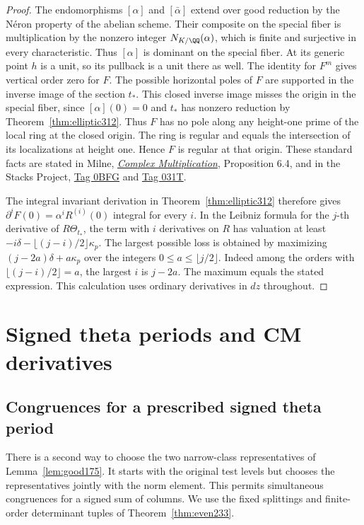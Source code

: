 \documentclass[a4paper,11pt]{article}
\theoremstyle{definition}
\theoremstyle{remark}
\numberwithin{equation}{section}
\begin{document}
\begin{proof}
The endomorphisms \([\alpha]\) and \([\bar\alpha]\) extend over
good reduction by the N\'eron property of the abelian scheme.
Their composite on the special fiber is multiplication by the
nonzero integer \(N_{K/\QQ}(\alpha)\), which is finite and
surjective in every characteristic. Thus \([\alpha]\) is dominant
on the special fiber. At its generic point \(h\) is a unit, so
its pullback is a unit there as well. The identity for \(F^m\)
gives vertical order zero for \(F\). The possible horizontal poles
of \(F\) are supported in the inverse image of the section \(t_*\).
This closed inverse image misses the origin in the special fiber,
since \([\alpha](0)=0\) and \(t_*\) has nonzero reduction by
Theorem~\ref{thm:elliptic312}. Thus \(F\) has no pole along any
height-one prime of the local ring at the closed origin. The ring
is regular and equals the intersection of its localizations at
height one. Hence \(F\) is regular at that origin. These standard
facts are stated in Milne, \href{https://www.jmilne.org/math/CourseNotes/CM.pdf}
{\emph{Complex Multiplication}}, Proposition 6.4, and in the
Stacks Project, \href{https://stacks.math.columbia.edu/tag/0BFG}{Tag 0BFG}
and \href{https://stacks.math.columbia.edu/tag/031T}{Tag 031T}.

The integral invariant derivation in
Theorem~\ref{thm:elliptic312} therefore gives
\(\partial^iF(0)=\alpha^i R^{(i)}(0)\) integral for every \(i\).
In the Leibniz formula for the \(j\)-th derivative of
\(R\Theta_{t_*}\), the term with \(i\) derivatives on \(R\)
has valuation at least \(-i\delta-\lfloor(j-i)/2\rfloor\kappa_p\).
The largest possible loss is obtained by maximizing
\((j-2a)\delta+a\kappa_p\) over the integers
\(0\le a\le\lfloor j/2\rfloor\). Indeed among the orders with
\(\lfloor(j-i)/2\rfloor=a\), the largest \(i\) is \(j-2a\).
The maximum equals the stated expression. This calculation uses
ordinary derivatives in \(dz\) throughout.
\end{proof}

\section{Signed theta periods and CM derivatives}\label{nav:g-V-3}


\subsection{Congruences for a prescribed signed theta period}\label{nav:V-27}
There is a second way to choose the two narrow-class representatives
of Lemma~\ref{lem:good175}. It starts with the original
test levels but chooses the representatives jointly with the norm
element. This permits simultaneous congruences for a signed sum of
columns. We use the fixed splittings and finite-order determinant
tuples of Theorem~\ref{thm:even233}.
\end{document}
